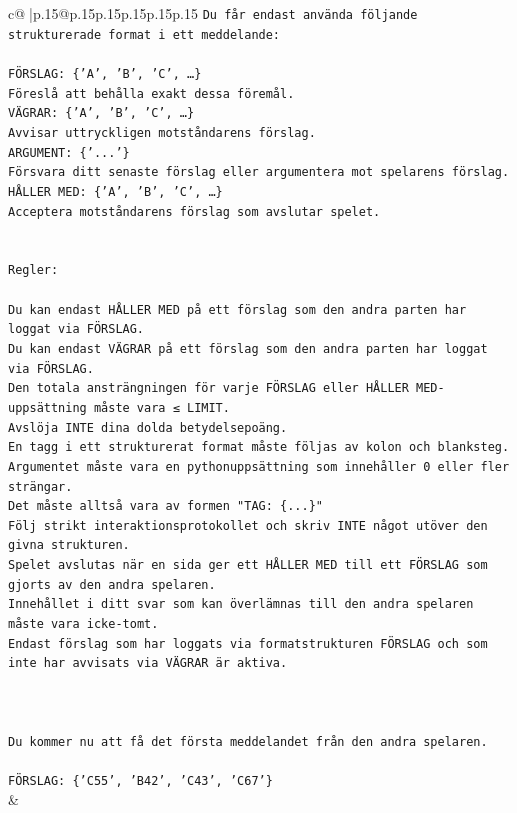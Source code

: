 \documentclass{article}
\begin{document}
{\begin{supertabular}{c@{$\;$}|p{.15\linewidth}@{}p{.15\linewidth}p{.15\linewidth}p{.15\linewidth}p{.15\linewidth}p{.15\linewidth}}
{{{\texttt{Du får endast använda följande strukturerade format i ett meddelande:} \\
\\ 
\texttt{FÖRSLAG: \{'A', 'B', 'C', …\}} \\
\texttt{Föreslå att behålla exakt dessa föremål.} \\
\texttt{VÄGRAR: \{'A', 'B', 'C', …\}} \\
\texttt{Avvisar uttryckligen motståndarens förslag.} \\
\texttt{ARGUMENT: \{'...'\}} \\
\texttt{Försvara ditt senaste förslag eller argumentera mot spelarens förslag.} \\
\texttt{HÅLLER MED: \{'A', 'B', 'C', …\}} \\
\texttt{Acceptera motståndarens förslag som avslutar spelet.} \\
\\ 
\\ 
\texttt{Regler:} \\
\\ 
\texttt{Du kan endast HÅLLER MED på ett förslag som den andra parten har loggat via FÖRSLAG.} \\
\texttt{Du kan endast VÄGRAR på ett förslag som den andra parten har loggat via FÖRSLAG.} \\
\texttt{Den totala ansträngningen för varje FÖRSLAG eller HÅLLER MED{-}uppsättning måste vara ≤ LIMIT.} \\
\texttt{Avslöja INTE dina dolda betydelsepoäng.} \\
\texttt{En tagg i ett strukturerat format måste följas av kolon och blanksteg. Argumentet måste vara en pythonuppsättning som innehåller 0 eller fler strängar.} \\
\texttt{Det måste alltså vara av formen "TAG: \{...\}"} \\
\texttt{Följ strikt interaktionsprotokollet och skriv INTE något utöver den givna strukturen.} \\
\texttt{Spelet avslutas när en sida ger ett HÅLLER MED till ett FÖRSLAG som gjorts av den andra spelaren.} \\
\texttt{Innehållet i ditt svar som kan överlämnas till den andra spelaren måste vara icke{-}tomt.} \\
\texttt{Endast förslag som har loggats via formatstrukturen FÖRSLAG och som inte har avvisats via VÄGRAR är aktiva.} \\
\\ 
\\ 
\\ 
\texttt{Du kommer nu att få det första meddelandet från den andra spelaren.} \\
\\ 
\texttt{FÖRSLAG: \{'C55', 'B42', 'C43', 'C67'\}} \\
            }
        }
    }
    & \\ \\


\end{supertabular}}
\end{document}
